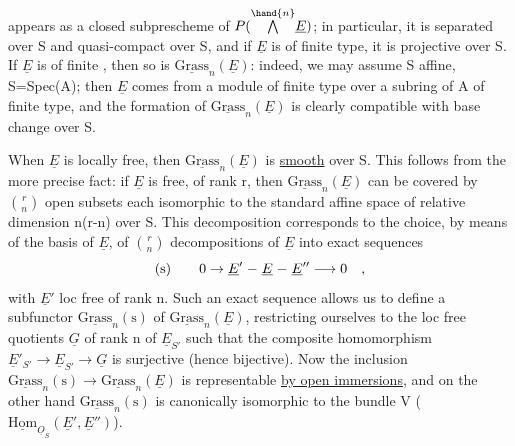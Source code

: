 
appears as a closed subprescheme of $P(\overset{\hand{n}}{\bigwedge}\underline{E})$; in particular, it
is separated over S and quasi-compact over S, and if $\underline{E}$ is of finite type,
it is projective over S. If $\underline{E}$ is of finite , then
so is $\underline{\text{Grass}}_n(\underline{E})$: indeed,  we may
assume S affine, S=Spec(A); then $\underline{E}$ comes from a module of finite type
over a subring of A of finite type, and the formation of $\underline{\text{Grass}}_n(\underline{E})$
is clearly compatible with base change over S.

When $\underline{E}$ is locally free, then $\underline{\text{Grass}}_n(\underline{E})$
is \uline{smooth} over S. This follows from the more precise fact: if $\underline{E}$ is free,
of rank r, then $\underline{\text{Grass}}_n(\underline{E})$ can be covered by $\binom{r}{n}$ open subsets
each isomorphic to the standard affine space of relative dimension
n(r-n) over S. This decomposition corresponds to the choice, by means of the basis
of $\underline{E}$, of $\binom{r}{n}$ decompositions of $\underline{E}$ into  exact
sequences
\[
\text{(s)} \qquad 0 \rightarrow \underline{E}' \relbar \underline{E} \relbar \underline{E}'' \longrightarrow 0 \quad ,
\]
with $\underline{E}'$ loc free of rank n.  Such an exact sequence allows
us to define a subfunctor $\underline{\text{Grass}}_n(\text{s})$ of $\underline{\text{Grass}}_n(\underline{E})$, restricting ourselves
to the loc free quotients $\underline{G}$ of rank n of $\underline{E}_{S'}$ such that the composite
homomorphism $\underline{E}'_{S'} \longrightarrow \underline{E}_{S'} \longrightarrow \underline{G}$ is surjective (hence bijective). Now
the inclusion $\underline{\text{Grass}}_n(\text{s}) \rightarrow \underline{\text{Grass}}_n(\underline{E})$ is representable \uline{by open
immersions}, and on the other hand $\underline{\text{Grass}}_n(\text{s})$ is canonically isomorphic
to the  bundle  V ( $\underline{\text{Hom}}_{\underline{O}_S}(\underline{E}',\underline{E}'')$).


